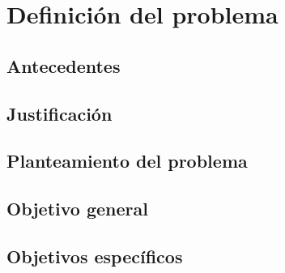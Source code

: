 \chapter{\textbf{Definición del problema}}

\thispagestyle{empty}

\section{Antecedentes}
\section{Justificación}
\section{Planteamiento del problema}
\section{Objetivo general}
\section{Objetivos específicos}

